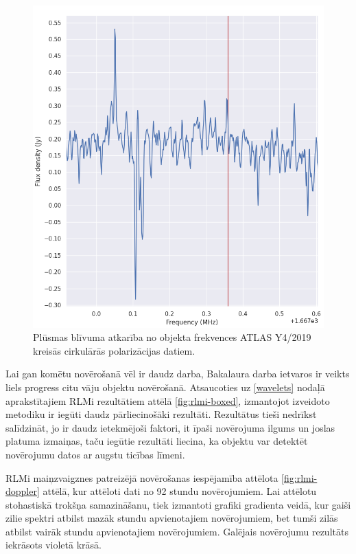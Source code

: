 \begin{figure}[H]

\centering
\includegraphics[width=\textwidth]{images/created/1667-atlas-found.png}
\caption{Plūsmas blīvuma atkarība no objekta frekvences ATLAS Y4/2019 kreisās cirkulārās polarizācijas datiem.}
\label{fig:atlas-combined}
\end{figure}




Lai gan komētu novērošanā vēl ir daudz darba, Bakalaura darba ietvaros ir veikts liels progress citu vāju objektu novērošanā. Atsaucoties uz \ref{wavelets} nodaļā aprakstītajiem RLMi rezultātiem attēlā \ref{fig:rlmi-boxed}, izmantojot izveidoto metodiku ir iegūti daudz pārliecinošāki rezultāti. Rezultātus tieši nedrīkst salīdzināt, jo ir daudz ietekmējoši faktori, it īpaši novērojuma ilgums un joslas platuma izmaiņas, taču iegūtie rezultāti liecina, ka objektu var detektēt novērojumu datos ar augstu ticības līmeni.

RLMi maiņzvaigznes patreizējā novērošanas iespējamība attēlota \ref{fig:rlmi-doppler} attēlā, kur attēloti dati no 92 stundu novērojumiem. Lai attēlotu stohastiskā trokšņa samazināšanu, tiek izmantoti grafiki gradienta veidā, kur gaiši zilie spektri atbilst mazāk stundu apvienotajiem novērojumiem, bet tumši zilās atbilst vairāk stundu apvienotajiem novērojumiem. Galējais novērojumu rezultāts iekrāsots violetā krāsā.

